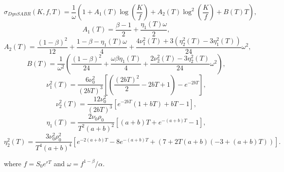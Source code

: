 \begin{strip2}
\vspace{5pt}
\begin{equation}\label{dynsabr}
\sigma_{DynSABR}(K,f,T)=\frac{1}{\omega}\left(1+A_1(T)\log\left(\frac{K}{f}\right)+A_2(T)\log^2\left(\frac{K}{f}\right)+B(T)T\right),
\end{equation}
\begin{equation}
A_1(T)=\frac{\beta-1}{2}+\frac{\eta_1(T)\omega}{2},
\end{equation}
\begin{equation}
A_2(T)=\frac{(1-\beta)^2}{12}+\frac{1-\beta-\eta_1(T)\omega}{4}+\frac{4\nu_1^2(T)+3(\eta_2^2(T)-3\eta_1^2(T))}{24}\omega^2,
\end{equation}
\begin{equation}
B(T)=\frac{1}{\omega^2}\left(\frac{(1-\beta)^2}{24}+\frac{\omega\beta\eta_1(T)}{4}+\frac{2\nu_2^2(T)-3\eta_2^2(T)}{24}\omega^2\right),
\end{equation}
\begin{equation}
\nu_1^2(T)=\frac{6\nu_0^2}{(2bT)^3}\left[\left(\frac{(2bT)^2}{2}-2bT+1\right)-e^{-2bT}\right],
\end{equation}
\begin{equation}
\nu_2^2(T)=\frac{12\nu_0^2}{(2bT)^3}\left[e^{-2bT}(1+bT)+bT-1\right],
\end{equation}
\begin{equation}
\eta_1(T)=\frac{2\nu_0\rho_0}{T^2(a+b)^2}\left[(a+b)T+e^{-(a+b)T}-1\right],
\end{equation}
\begin{equation}
\eta_2^2(T)=\frac{3\nu_0^2\rho_0^2}{T^4(a+b)^4}\left[e^{-2(a+b)T}-8e^{-(a+b)T}+(7+2T(a+b)(-3+(a+b)T))\right].
\end{equation}
\end{strip2}
\noindent where $f=S_0e^{rT}$ and $\omega=f^{1-\beta}/\alpha$.